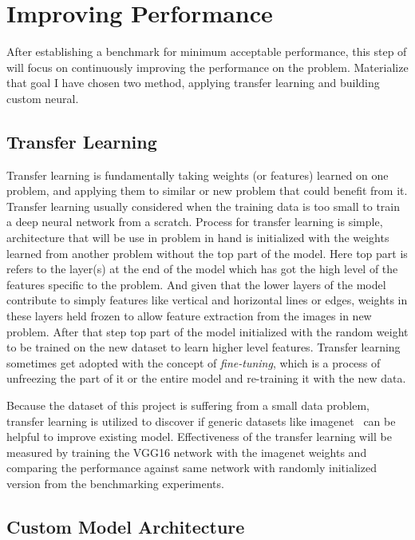 
\section{Improving Performance}
After establishing a benchmark for minimum acceptable performance, this step of will focus on continuously improving the performance on the problem. 
Materialize that goal I have chosen two method, applying transfer learning and building custom neural.

\subsection{Transfer Learning} \label{subsec:transferlearning}
Transfer learning is fundamentally taking weights (or features) learned on one problem, and applying them to similar or new problem that could benefit from it.
Transfer learning usually considered when the training data is too small to train a deep neural network from a scratch.
Process for transfer learning is simple, architecture that will be use in problem in hand is initialized with the weights learned from another problem without the top part of the model.
Here top part is refers to the layer(s) at the end of the model which has got the high level of the features specific to the problem.
And given that the lower layers of the model contribute to simply features like vertical and horizontal lines or edges, weights in these layers held frozen to allow feature extraction from the images in new problem.
After that step top part of the model initialized with the random weight to be trained on the new dataset to learn higher level features.
Transfer learning sometimes get adopted with the concept of \emph{fine-tuning}, which is a process of unfreezing the part of it or the entire model and re-training it with the new data.

Because the dataset of this project is suffering from a small data problem, transfer learning is utilized to discover if generic datasets like imagenet~\cite{imagenet} can be helpful to improve existing model.
Effectiveness of the transfer learning will be measured by training the VGG16 network with the imagenet weights and comparing the performance against same network with randomly initialized version from the benchmarking experiments.

\subsection{Custom Model Architecture}


